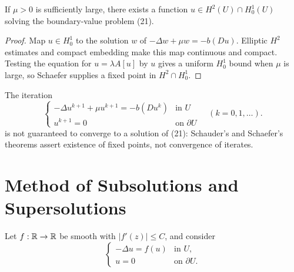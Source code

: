 \begin{theorem}
\label{thm:schaefer-quasilinear-existence}

If $\mu > 0$ is sufficiently large, there exists a function $u \in H^2(U) \cap H^1_0(U)$ solving the boundary-value problem (21).
\end{theorem}

\begin{proof}
\sketch Map $u\in H_0^1$ to the solution $w$ of $-\Delta w+\mu w=-b(Du)$. Elliptic $H^2$ estimates and compact embedding make this map continuous and compact. Testing the equation for $u=\lambda A[u]$ by $u$ gives a uniform $H_0^1$ bound when $\mu$ is large, so Schaefer supplies a fixed point in $H^2\cap H_0^1$.
\end{proof}

\begin{remark}
\label{rem:iteration-scheme-warning}

The iteration
\[
\begin{cases}
-\Delta u^{k+1} + \mu u^{k+1} = -b(Du^k) & \text{in } U \\
u^{k+1} = 0 & \text{on } \partial U
\end{cases} \quad (k = 0, 1, \ldots).
\]
is not guaranteed to converge to a solution of (21): Schauder's and Schaefer's theorems assert existence of fixed points, not convergence of iterates.
\end{remark}

\section{Method of Subsolutions and Supersolutions}
\label{sec:subsolutions-supersolutions}

Let $f:\mathbb{R}\to\mathbb{R}$ be smooth with $|f'(z)|\leq C$, and consider
\[
\begin{cases}
-\Delta u=f(u) & \text{in }U,\\
u=0 & \text{on }\partial U.
\end{cases}
\tag{1}
\]

